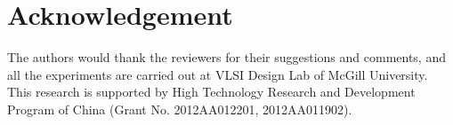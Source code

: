 \documentclass[10pt,journal]{IEEEtran}
\begin{document}
\section*{Acknowledgement}
The authors would thank the reviewers for their suggestions and comments, and all the experiments are carried out at VLSI Design Lab of McGill University. This research is supported by High Technology Research and Development Program of China (Grant No. 2012AA012201, 2012AA011902).



\end{document}
